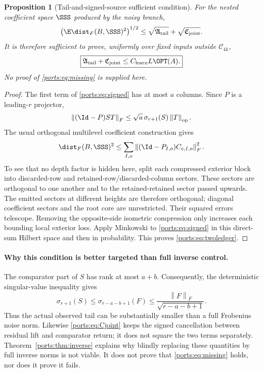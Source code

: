 \documentclass[11pt,oneside,openany,a4paper]{book}
\numberwithin{equation}{chapter}
\newtheorem{proposition}[theorem]{Proposition}
\theoremstyle{definition}
\theoremstyle{remark}
\newcommand{\F}[1]{\left\lVert#1\right\rVert_F}
\newcommand{\op}[1]{\left\lVert#1\right\rVert_{\rm op}}
\begin{document}
\begin{proposition}[Tail-and-signed-source sufficient condition]\label{ports:prop:remaining}
For the nested coefficient space $\SSS$ produced by the noisy branch,
\begin{equation}\label{ports:eq:twoledger}
 \left(\E\dist_F(B,\SSS)^2\right)^{1/2}
 \le\sqrt{\mathfrak A_{\rm tail}}+\sqrt{\mathfrak C_{\rm joint}}.
\end{equation}
It is therefore sufficient to prove, uniformly over fixed inputs outside $\mathcal C_{4k}$,
\begin{equation}\label{ports:eq:missing}
 \boxed{\mathfrak A_{\rm tail}+\mathfrak C_{\rm joint}
        \le C_{\rm learn}L\OPT(A).}
\end{equation}
No proof of \eqref{ports:eq:missing} is supplied here.
\end{proposition}
\begin{proof}
The first term of \eqref{ports:eq:signed} has at most $a$ columns. Since $P$ is a leading-$r$ projector,
\[
 \F{(\Id-P)ST}\le\sqrt a\,\sigma_{r+1}(S)\op T.
\]
The usual orthogonal multilevel coefficient construction gives
\[
 \dist_F(B,\SSS)^2\le\sum_{I,o}\F{(\Id-P_{I,o})C_{c,I,o}}^2.
\]
To see that no depth factor is hidden here, split each compressed exterior block into discarded-row and retained-row/discarded-column sectors. These sectors are orthogonal to one another and to the retained-retained sector passed upwards. The emitted sectors at different heights are therefore orthogonal; diagonal coefficient sectors and the root core are unrestricted. Their squared errors telescope. Removing the opposite-side isometric compression only increases each bounding local exterior loss. Apply Minkowski to \eqref{ports:eq:signed} in this direct-sum Hilbert space and then in probability. This proves \eqref{ports:eq:twoledger}.
\end{proof}

\paragraph{Why this condition is better targeted than full inverse control.}
The comparator part of $S$ has rank at most $a+b$. Consequently, the deterministic singular-value inequality gives
\begin{equation}\label{ports:eq:tailweyl}
 \sigma_{r+1}(S)\le\sigma_{r-a-b+1}(F)
 \le\frac{\F F}{\sqrt{r-a-b+1}}.
\end{equation}
Thus the actual observed tail can be substantially smaller than a full Frobenius noise norm. Likewise \eqref{ports:eq:Cjoint} keeps the signed cancellation between residual lift and comparator return; it does not square the two terms separately. Theorem~\ref{ports:thm:inverse} explains why blindly replacing these quantities by full inverse norms is not viable. It does not prove that \eqref{ports:eq:missing} holds, nor does it prove it fails.
\end{document}
